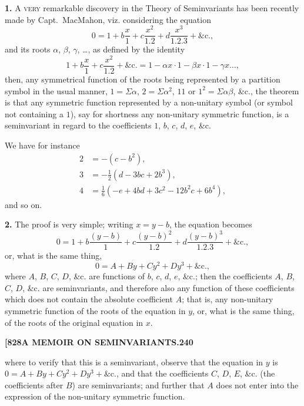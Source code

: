 \documentclass[12pt,a4paper]{article}
\theoremstyle{definition}
\begin{document}
\noindent\textbf{1.} A \textsc{very} remarkable discovery in the Theory of Seminvariants has been recently made by Capt.~MacMahon, viz. considering the equation
\[
0 = 1 + b\frac{x}{1} + c\frac{x^2}{1.2} + d\frac{x^3}{1.2.3} + \&\text{c.},
\]
and its roots $\alpha$, $\beta$, $\gamma$, \dots, as defined by the identity
\[
1 + b\frac{x}{1} + c\frac{x^2}{1.2} + \&\text{c.} = 1 - \alpha x \cdot 1 - \beta x \cdot 1 - \gamma x \dots,
\]
then, any symmetrical function of the roots being represented by a partition symbol in the usual manner, $1 = \Sigma\alpha$, $2 = \Sigma\alpha^2$, $11$ or $1^2 = \Sigma\alpha\beta$, \&c., the theorem is that any symmetric function represented by a non-unitary symbol (or symbol not containing a $1$), say for shortness any non-unitary symmetric function, is a seminvariant in regard to the coefficients $1$, $b$, $c$, $d$, $e$, \&c.

We have for instance
\begin{align*}
2 &= -(c - b^2), \\
3 &= -\tfrac{1}{2}(d - 3bc + 2b^3), \\
4 &= \tfrac{1}{6}(-e + 4bd + 3c^2 - 12b^2c + 6b^4),
\end{align*}
and so on.

\noindent\textbf{2.} The proof is very simple; writing $x = y - b$, the equation becomes
\[
0 = 1 + b\frac{(y-b)}{1} + c\frac{(y-b)^2}{1.2} + d\frac{(y-b)^3}{1.2.3} + \&\text{c.},
\]
or, what is the same thing,
\[
0 = A + By + Cy^2 + Dy^3 + \&\text{c.},
\]
where $A$, $B$, $C$, $D$, \&c. are functions of $b$, $c$, $d$, $e$, \&c.; then the coefficients $A$, $B$, $C$, $D$, \&c. are seminvariants, and therefore also any function of these coefficients which does not contain the absolute coefficient $A$; that is, any non-unitary symmetric function of the roots of the equation in $y$, or, what is the same thing, of the roots of the original equation in $x$.

\newpage
\setcounter{page}{240}

\noindent\textbf{[828}\hfill\textbf{A MEMOIR ON SEMINVARIANTS.}\hfill\textbf{240}

\bigskip

\noindent where to verify that this is a seminvariant, observe that the equation in $y$ is $0 = A + By + Cy^2 + Dy^3 + \&\text{c.}$, and that the coefficients $C$, $D$, $E$, \&c. (the coefficients after $B$) are seminvariants; and further that $A$ does not enter into the expression of the non-unitary symmetric function.
\end{document}
